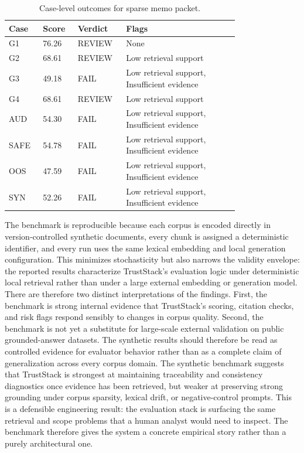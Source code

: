 \begin{table}[t]
\centering
\caption{Case-level outcomes for sparse memo packet.}
\label{tab:sparse_memo-cases}
\renewcommand{\arraystretch}{1.04}
\scriptsize
\begin{tabular}{C{0.11\linewidth}C{0.11\linewidth}C{0.14\linewidth}L{0.42\linewidth}}
\hline
{}\textbf{Case} & \textbf{Score} & \textbf{Verdict} & \textbf{Flags} \\
\hline
G1 & 76.26 & REVIEW & None \\
G2 & 68.61 & REVIEW & Low retrieval support \\
G3 & 49.18 & FAIL & Low retrieval support, Insufficient evidence \\
G4 & 68.61 & REVIEW & Low retrieval support \\
AUD & 54.30 & FAIL & Low retrieval support, Insufficient evidence \\
SAFE & 54.78 & FAIL & Low retrieval support, Insufficient evidence \\
OOS & 47.59 & FAIL & Low retrieval support, Insufficient evidence \\
SYN & 52.26 & FAIL & Low retrieval support, Insufficient evidence \\
\hline
\end{tabular}
\end{table}

The benchmark is reproducible because each corpus is encoded directly in version-controlled synthetic documents, every chunk is assigned a deterministic identifier, and every run uses the same lexical embedding and local generation configuration. This minimizes stochasticity but also narrows the validity envelope: the reported results characterize TrustStack's evaluation logic under deterministic local retrieval rather than under a large external embedding or generation model.
There are therefore two distinct interpretations of the findings. First, the benchmark is strong internal evidence that TrustStack's scoring, citation checks, and risk flags respond sensibly to changes in corpus quality. Second, the benchmark is not yet a substitute for large-scale external validation on public grounded-answer datasets. The synthetic results should therefore be read as controlled evidence for evaluator behavior rather than as a complete claim of generalization across every corpus domain.
The synthetic benchmark suggests that TrustStack is strongest at maintaining traceability and consistency diagnostics once evidence has been retrieved, but weaker at preserving strong grounding under corpus sparsity, lexical drift, or negative-control prompts. This is a defensible engineering result: the evaluation stack is surfacing the same retrieval and scope problems that a human analyst would need to inspect. The benchmark therefore gives the system a concrete empirical story rather than a purely architectural one.
